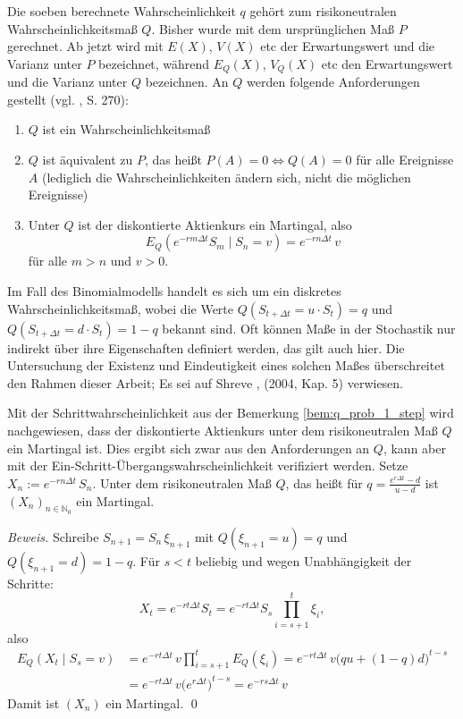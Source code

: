\begin{defi}
Die soeben berechnete Wahrscheinlichkeit $q$ gehört zum risikoneutralen Wahrscheinlichkeitsmaß $Q$.
Bisher wurde mit dem ursprünglichen Maß $P$ gerechnet. Ab jetzt wird mit $E(X)$, $V(X)$ etc der Erwartungswert
und die Varianz unter $P$ bezeichnet, während $E_Q(X)$, $V_Q(X)$ etc den Erwartungswert und die Varianz unter $Q$
bezeichnen. An $Q$ werden folgende Anforderungen gestellt (vgl. \cite{hull}, S. 270):
\begin{enumerate}
    \item $Q$ ist ein Wahrscheinlichkeitsmaß
    \item $Q$ ist äquivalent zu $P$, das heißt $P(A)=0 \iff Q(A)=0$ für alle Ereignisse $A$ (lediglich die Wahrscheinlichkeiten ändern sich, nicht die möglichen Ereignisse)
    \item Unter $Q$ ist der diskontierte Aktienkurs ein Martingal, also $$E_Q(e^{-r m\Delta t} S_{m} \mid S_n = v) = e^{-rn\Delta t}\, v$$ für alle $m \gt n$ und $v>0$.
\end{enumerate}
Im Fall des Binomialmodells handelt es sich um ein diskretes Wahrscheinlichkeitsmaß, 
wobei die Werte $Q(S_{t + \Delta t} = u \cdot S_t)=q$ und $Q(S_{t + \Delta t} = d \cdot S_t)=1-q$ bekannt sind.
Oft können Maße in der Stochastik nur indirekt über ihre Eigenschaften definiert werden, das gilt auch hier. Die Untersuchung der Existenz und Eindeutigkeit eines solchen Maßes überschreitet den Rahmen dieser Arbeit; Es sei auf Shreve \cite{shreve}, (2004, Kap. 5) verwiesen.
\end{defi}

\begin{lemma}
Mit der Schrittwahrscheinlichkeit aus der Bemerkung \ref{bem:q_prob_1_step} wird nachgewiesen,
dass der diskontierte Aktienkurs unter dem risikoneutralen Maß $Q$ ein Martingal ist. Dies ergibt sich zwar aus den Anforderungen 
an $Q$, kann aber mit der Ein-Schritt-Übergangswahrscheinlichkeit verifiziert werden.
Setze $X_n := e^{-r n \Delta t}\, S_n$. Unter dem risikoneutralen Maß $Q$, das heißt für 
$q=\frac{e^{r\Delta t}-d}{u-d}$ ist $(X_n)_{n\in\mathbb N_0}$ ein Martingal.

\textit{Beweis.} Schreibe $S_{n+1}=S_n\,\xi_{n+1}$ mit 
$Q(\xi_{n+1}=u)=q$ und $Q(\xi_{n+1}=d)=1-q$. 
Für $s<t$ beliebig und wegen Unabhängigkeit der Schritte:
$$
X_t
= e^{-rt\Delta t} S_t
= e^{-rt\Delta t} S_s \prod_{i=s+1}^{t} \xi_i,
$$
also
$$
\begin{aligned}
E_Q(X_t\mid S_s=v)
&= e^{-rt\Delta t}\, v \prod_{i=s+1}^{t} E_Q(\xi_i)
= e^{-rt\Delta t}\, v \big(q u + (1-q)d\big)^{t-s} \\
&= e^{-rt\Delta t}\, v \big(e^{r\Delta t}\big)^{t-s}
= e^{-rs\Delta t}\, v
\end{aligned}
$$
Damit ist $(X_n)$ ein Martingal. \qed
\end{lemma}

